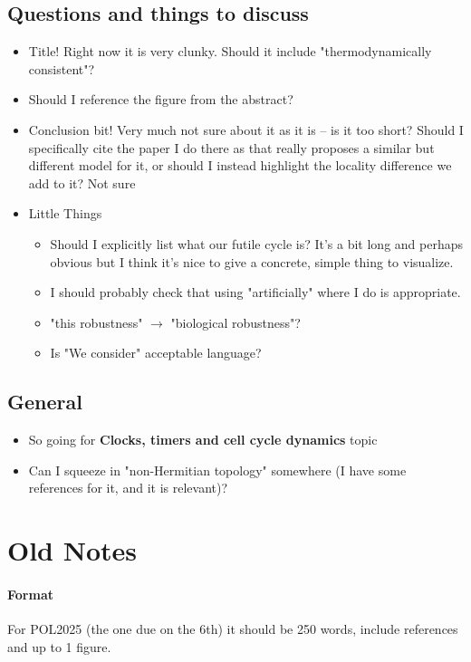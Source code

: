 \documentclass[11pt]{article}
\begin{document}
\subsection{Questions and things to discuss}
\begin{itemize}
	\item Title! Right now it is very clunky. Should it include "thermodynamically consistent"?
	\item Should I reference the figure from the abstract?
    \item Conclusion bit! Very much not sure about it as it is -- is it too short? Should I specifically cite the paper I do there as that really proposes a similar but different model for it, or should I instead highlight the locality difference we add to it? Not sure
	\item Little Things \begin{itemize}
		      \item Should I explicitly list what our futile cycle is? It's a bit long and perhaps obvious but I think it's nice to give a concrete, simple thing to visualize.
              \item I should probably check that using "artificially" where I do is appropriate.
              \item "this robustness" $\rightarrow$ "biological robustness"?
              \item Is "We consider" acceptable language?
	      \end{itemize}
\end{itemize}

\subsection{General}
\begin{itemize}
	\item So going for \textbf{Clocks, timers and cell cycle dynamics} topic
	\item Can I squeeze in "non-Hermitian topology" somewhere (I have some references for it, and it is relevant)?
\end{itemize}

\newpage
\section{Old Notes}
\paragraph{Format}
For POL2025 (the one due on the 6th) it should be 250 words, include references and up to 1 figure.
\end{document}

